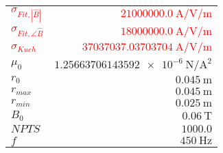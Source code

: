 
{%
    \begin{center}
    \label{tab:fitparams:alu:freq:high:exact}
    \begin{tabular}{lr}
    \toprule
        \textcolor{red}{$\sigma_{Fit,|\hat{B}|}$} & \textcolor{red}{$\SI{21000000.0}{\ampere\per\volt\per\meter}$}\\
        \textcolor{red}{$\sigma_{Fit,\angle\hat{B}}$} & \textcolor{red}{$\SI{18000000.0}{\ampere\per\volt\per\meter}$}\\
        \textcolor{red}{$\sigma_{Kuch}$} & \textcolor{red}{$\SI{37037037.03703704}{\ampere\per\volt\per\meter}$}\\
        $\mu_0$ & $\SI{1.25663706143592e-6}{\newton\per\ampere\squared}$\\
        $r_0$ & $\SI{0.045}{\meter}$\\
        $r_{max}$ & $\SI{0.045}{\meter}$\\
        $r_{min}$ & $\SI{0.025}{\meter}$\\
        $B_0$ & $\SI{0.06}{\tesla}$\\
        $NPTS$ & $\num{1000.0}$\\
        $f$ & $\SI{450}{\hertz}$\\

    \bottomrule
    \end{tabular}
    \end{center}
}


